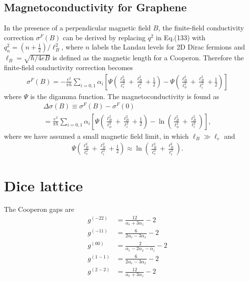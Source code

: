 \documentclass[aps,prb,amsmath,amssymb,footinbib,showpacs,twocolumn]{revtex4-2}
\begin{document}
\begin{widetext}
\subsection{Magnetoconductivity for Graphene}
In the presence of a perpendicular magnetic field $\textit{B}$, the finite-field conductivity correction $\sigma^{F}(B)$ can be derived by replacing $q^2$ in Eq.(133) with $q^{2}_{n}=(n+\frac{1}{2})/\ell^{2}_{B}$, where $n$ labels the Landau levels for 2D Dirac fermions and $\ell_{B}=\sqrt{\hbar/4eB}$ is defined as the magnetic length for a Cooperon. Therefore the finite-field conductivity correction becomes
\begin{align}
    \sigma^{F}(B)=-\frac{e^{2}}{\pi h}\sum_{i=0, 1}\alpha_{i}\left[\Psi\left(\frac{\ell^{2}_{B}}{\ell^{2}_{e}}+\frac{\ell^{2}_{B}}{\ell^{2}_{i}}+\frac{1}{2}\right)-\Psi\left(\frac{\ell^{2}_{B}}{\ell^{2}_{\phi}}+\frac{\ell^{2}_{B}}{\ell^{2}_{i}}+\frac{1}{2}\right)\right]
\end{align}
where $\Psi$ is the digamma function. The magnetoconductivity is found as
\begin{multline}
    \Delta\sigma(B) \equiv  \sigma^{F}(B)- \sigma^{F}(0) \\ 
    =\frac{e^{2}}{\pi h}\sum_{i=0, 1}\alpha_{i}\left[\Psi\left(\frac{\ell^{2}_{B}}{\ell^{2}_{\phi}}+\frac{\ell^{2}_{B}}{\ell^{2}_{i}}+\frac{1}{2}\right)-\ln\left(\frac{\ell^{2}_{B}}{\ell^{2}_{\phi}}+\frac{\ell^{2}_{B}}{\ell^{2}_{i}}\right)\right],
\end{multline}
where we have assumed a small magnetic field limit, in which $\ell_{B}\gg \ell_{e}$ and 
\begin{align}
    \Psi\left(\frac{\ell^{2}_{B}}{\ell^{2}_{e}}+\frac{\ell^{2}_{B}}{\ell^{2}_{i}}+\frac{1}{2}\right) \approx \ln\left(\frac{\ell^{2}_{B}}{\ell^{2}_{e}}+\frac{\ell^{2}_{B}}{\ell^{2}_{i}}\right).
\end{align}



\section{Dice lattice}


The Cooperon gaps are 
\begin{align}
    g^{(-22)}&=\frac{12}{\alpha _e+3 \alpha _z}-2\nonumber\\
    g^{(-11)}&=\frac{6}{2 \alpha _e-3 \alpha _x}-2\nonumber\\
    g^{(00)}&=\frac{2}{\alpha _e-2 \alpha _x-\alpha _z}-2\nonumber\\
    g^{(1-1)}&=\frac{6}{2 \alpha _e-3 \alpha _x}-2\nonumber\\
    g^{(2-2)}&=\frac{12}{\alpha _e+3 \alpha _z}-2
\end{align}


\end{widetext}
\end{document}
